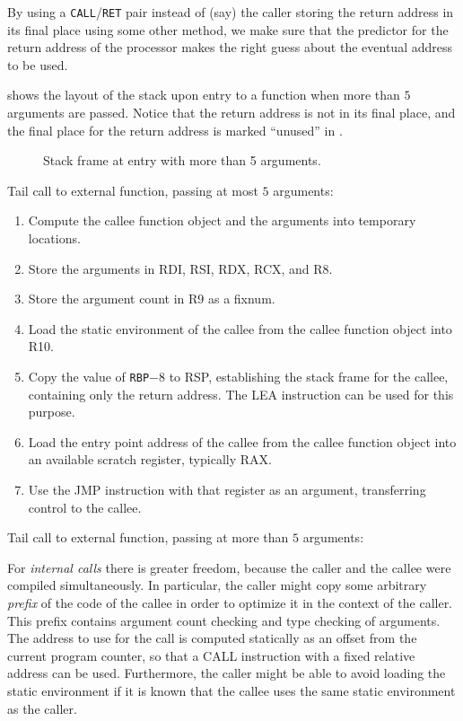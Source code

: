 By using a \texttt{CALL}/\texttt{RET} pair instead of (say) the caller
storing the return address in its final place using some other method,
we make sure that the predictor for the return address of the
processor makes the right guess about the eventual address to be used.

 shows the layout of the stack
upon entry to a function when more than $5$ arguments are passed.
Notice that the return address is not in its final place, and the
final place for the return address is marked ``unused'' in
.

\begin{figure}
\begin{center}
\end{center}
\caption{\label{fig-x86-64-stack-frame-at-entry}
Stack frame at entry with more than 5 arguments.}
\end{figure}

Tail call to external function, passing at most $5$ arguments:

\begin{enumerate}
\item Compute the callee function object and the arguments into
  temporary locations.
\item Store the arguments in RDI, RSI, RDX, RCX, and R8.
\item Store the argument count in R9 as a fixnum.
\item Load the static environment of the callee from the callee
  function object into R10.
\item Copy the value of \texttt{RBP}$ - 8$ to RSP, establishing the stack frame
  for the callee, containing only the return address.  The LEA
  instruction can be used for this purpose.
\item Load the entry point address of the callee from the callee
  function object into an available scratch register, typically RAX.
\item Use the JMP instruction with that register as an argument,
  transferring control to the callee.
\end{enumerate}

Tail call to external function, passing at more than $5$ arguments:%

For \emph{internal calls} there is greater freedom, because the caller
and the callee were compiled simultaneously.  In particular, the
caller might copy some arbitrary \emph{prefix} of the code of the
callee in order to optimize it in the context of the caller.  This
prefix contains argument count checking and type checking of
arguments.  The address to use for the call is computed statically as
an offset from the current program counter, so that a CALL instruction
with a fixed relative address can be used.  Furthermore, the caller
might be able to avoid loading the static environment if it is known
that the callee uses the same static environment as the caller.


